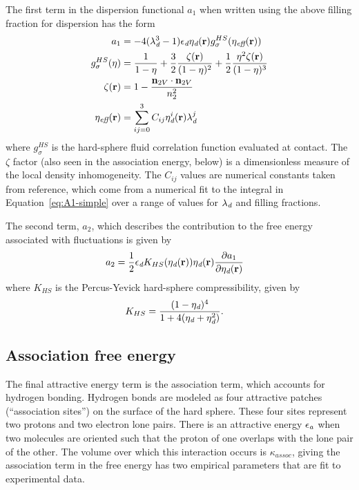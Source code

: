 \documentclass[letterpaper,twocolumn,amsmath,amssymb,prb]{revtex4-1}
\newcommand{\xx}{\textbf{r}}
\begin{document}
The first term in the dispersion functional $a_1$ when written using
the above filling fraction for dispersion has the form
\begin{align}
  a_1 &= 
   -4(\lambdadisp^3 - 1)\epsilondisp \etadisp(\xx)
    g^{HS}_\sigma(\eta_\textit{eff}(\xx)) \\
  g_\sigma^{HS}(\eta) &= \frac{1}{1-\eta}
  +\frac32\frac{\zeta(\xx)}{(1-\eta)^2}
  + \frac12\frac{\eta^2\zeta(\xx)}{(1-\eta)^3}
  \\
  \zeta(\xx) &= 1 - \frac{\mathbf{n}_{2V}\cdot\mathbf{n}_{2V}}{n_2^2}\\
  \eta_\textit{eff}(\xx) &= \sum_{ij=0}^3 C_{ij}  \etadisp^i(\xx)
  \lambdadisp^j
\end{align}
where $g_\sigma^{HS}$
is the hard-sphere fluid correlation function evaluated at contact.
The $\zeta$ factor
(also seen in the association energy, below) is a dimensionless
measure of the local density inhomogeneity. The $C_{ij}$ values
 are numerical constants taken from
reference\cite{gil-villegas-1997-SAFT-VR}, which come from a numerical
fit to the integral in Equation~\ref{eq:A1-simple} over a range of
values for $\lambda_\textit{d}$ and filling fractions.

The second term, $a_2$, which describes the contribution to the free
energy associated with fluctuations is given by
\begin{align}
  a_2 &= \frac12 \epsilondisp
              K_{HS}(\etadisp(\xx)) \etadisp(\xx)
              \frac{\partial a_1}{\partial \etadisp(\xx)}
\end{align}
where $K_{HS}$ is the Percus-Yevick hard-sphere compressibility, given
by
\begin{align}
  K_{HS} &=
    \frac{(1 - \eta_\textit{d})^4}{1 + 4(\eta_\textit{d} + \eta_\textit{d}^2)}.
\end{align}

\subsection{Association free energy}
The final attractive energy term is the association term, which
accounts for hydrogen bonding.  Hydrogen bonds are modeled as four
attractive patches (``association sites'') on the surface of the hard
sphere.  These four sites represent two protons and two electron lone
pairs.  There is an attractive energy $\epsilon_\textit{a}$ when
two molecules are oriented such that the proton of one overlaps
with the lone pair of the other.  The volume over which this
interaction occurs is $\kappa_\textit{assoc}$, giving the association
term in the free energy has two empirical parameters that are fit to
experimental data.
\end{document}
